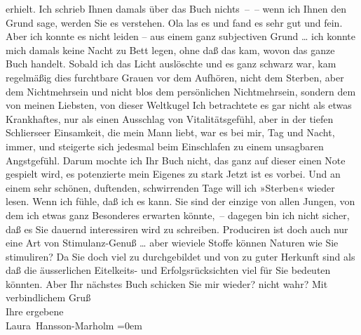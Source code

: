 \begin{ledgroupsized}[t]{13cm}
                    erhielt. Ich schrieb Ihnen damals über das Buch nichts – – wenn ich Ihnen den
                    Grund sage, werden Sie es verstehen. Ola las
                    es und fand es sehr gut und fein.\pend
           \pstart
           Aber ich konnte es nicht leiden – aus einem ganz subjectiven Grund {\dots} ich konnte mich damals keine Nacht zu Bett legen,
                    ohne daß das kam, wovon das ganze Buch handelt. Sobald ich das Licht auslöschte
                    und es ganz schwarz war, kam regelmäßig dies furchtbare Grauen vor dem Aufhören,
                    nicht dem Sterben, aber dem Nichtmehrsein und nicht blos dem persönlichen
                    Nichtmehrsein, sondern dem von meinen Liebsten, von dieser Weltkugel{\dotsfour} Ich betrachtete es gar nicht als etwas
                    Krankhaftes, nur als einen Ausschlag von Vitalitätsgefühl, aber in der tiefen
                        Schlierseer Einsamkeit, die mein Mann liebt, war es bei mir,
                    Tag und Nacht, immer, und steigerte sich jedesmal beim Einschlafen zu einem
                    unsagbaren Angstgefühl. Darum mochte ich Ihr Buch nicht, das ganz auf dieser einen Note gespielt
                    wird, es potenzierte mein Eigenes zu stark{\dotsfour}\pend
           \pstart
           Jetzt ist es vorbei. Und an einem sehr schönen, duftenden, schwirrenden Tage will
                    ich »Sterben« wieder lesen. Wenn ich fühle,
                    daß {\pb}ich es
                    kann.\pend
           \pstart
           Sie sind der einzige von allen Jungen, von dem ich etwas ganz Besonderes erwarten
                    könnte, – dagegen bin ich nicht sicher, daß es Sie dauernd interessiren wird zu
                    schreiben. Produciren ist doch auch nur eine Art von Stimulanz-Genuß {\dots} aber wieviele Stoffe können Naturen wie Sie
                    stimuliren? Da Sie doch viel zu durchgebildet und von zu guter Herkunft sind als
                    daß die äusserlichen Eitelkeits- und Erfolgsrücksichten viel für Sie bedeuten
                    könnten.\pend
           \pstart
           Aber Ihr nächstes Buch schicken Sie mir wieder? nicht wahr?\pend
           \pstart
           Mit verbindlichem Gruß{\\[\baselineskip]} Ihre ergebene{\\[\baselineskip]}\spacefill\mbox{Laura Hansson-Marholm}\pend
           \leftskip=0em{}
         

\end{ledgroupsized}
